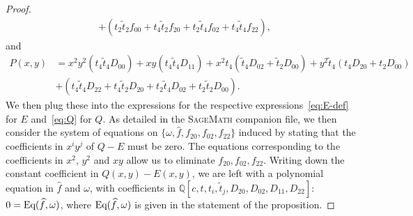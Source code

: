 \documentclass{scrartcl}
\newcommand{\Q}{\mathbb{Q}}
\newcommand\wt[1]{\widetilde{#1}}
\newcommand\wh[1]{\widehat{#1}}
\begin{document}
\begin{proof}
\begin{align*}
&+(t_2\widetilde{t}_2f_{00}+t_4\widetilde{t}_2f_{20}+t_2\widetilde{t}_4f_{02}+t_4\widetilde{t}_4f_{22}),
\end{align*}
and
\begin{align*}
P(x,y) &= x^2y^2(t_4\widetilde{t}_4D_{00}) +xy(t_4\widetilde{t}_4D_{11}) +x^2t_4(\widetilde{t}_4D_{02}+\widetilde{t}_2D_{00}) +y^2\widetilde{t}_4(t_4D_{20}+t_2D_{00}) \\
&+(t_4\widetilde{t}_4D_{22}+t_4\widetilde{t}_2D_{20}+t_2\widetilde{t}_4D_{02}+t_2\widetilde{t}_2D_{00}).
\end{align*}
We then plug these into the expressions for the respective expressions~\eqref{eq:E-def} for $E$ and~\eqref{eq:Q} for $Q$. As detailed in the \textsc{SageMath} companion file, we then consider the system of equations on $\{\omega, \wh{f},f_{20},f_{02},f_{22}\}$ induced by stating that the coefficients in $x^iy^j$ of $Q-E$ must be zero. The equations corresponding to the coefficients in $x^2$, $y^2$ and $xy$ allow us to eliminate $f_{20},f_{02},f_{22}$. Writing down the constant coefficient in $Q(x,y)-E(x,y)$, we are left with a polynomial equation in $\widehat{f}$ and $\omega$, with coefficients in $\Q[c,t, t_i,\wt{t}_j, D_{20},D_{02},D_{11},D_{22}]$: $0=\textnormal{Eq}(\wh{f},\omega)$, where $\textnormal{Eq}(\wh{f},\omega)$ is given in the statement of the proposition.
\end{proof}
\end{document}
